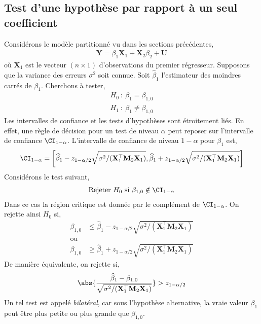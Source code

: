 \subsection{Test d'une hypothèse par rapport à un seul coefficient}
Considérons le modèle partitionné vu dans les sections précédentes,
\begin{align*}
\mathbf{Y} = \beta_1\mathbf{X}_1 + \mathbf{X}_2\beta_2 + \mathbf{U}
\end{align*}
où $\mathbf{X}_1$ est le vecteur $(n\times 1)$ d'observations du premier régresseur. Supposons que la variance des erreurs $\sigma^2$ soit connue. Soit $\widehat{\beta}_1$ l'estimateur des moindres carrés de $\beta_1$.  Cherchons à tester,
\begin{align}
H_0 \ : \  \beta_1 = \beta_{1, 0}\nonumber\\
H_1 \ : \  \beta_1 \neq \beta_{1, 0}
\label{eq34}
\end{align}
Les intervalles de confiance et les tests d'hypothèses sont étroitement liés. En effet, une règle de décision pour un test de niveau $\alpha$ peut reposer  sur l'intervalle de confiance $\CI_{1-\alpha}$. L'intervalle de confiance de niveau $1-\alpha$ pour $\beta_1$ est,
\begin{align*}
\CI_{1-\alpha} = \left[ \widehat{\beta}_1 - z_{1 - \alpha/2}\sqrt{\sigma^2/(\mathbf{X}_1^\top\mathbf{M}_2\mathbf{X}_1)},  \widehat{\beta}_1 + z_{1 - \alpha/2}\sqrt{\sigma^2/(\mathbf{X}_1^\top\mathbf{M}_2\mathbf{X}_1)}\right]
\end{align*}
Considérons le test suivant,
\begin{align*}
\textrm{Rejeter} \ H_0 \  \textrm{si} \ \beta_{1,0} \notin \CI_{1-\alpha}
\end{align*}
Dans ce cas la région critique est donnée par le complément de $ \CI_{1-\alpha}$. On rejette ainsi $H_0$ si,
\begin{align*}
\beta_{1,0}&\leq  \widehat{\beta}_1 - z_{1 - \alpha/2}\sqrt{\sigma^2/(\mathbf{X}_1^\top\mathbf{M}_2\mathbf{X}_1)}\\
\textrm{ou}&\\
\beta_{1,0}&\geq  \widehat{\beta}_1 + z_{1 - \alpha/2}\sqrt{\sigma^2/(\mathbf{X}_1^\top\mathbf{M}_2\mathbf{X}_1)}
\end{align*}
De manière équivalente, on rejette si,
\begin{align}
\abs{\frac{\widehat{\beta}_1 - \beta_{1,0}}{ \sqrt{\sigma^2/(\mathbf{X}_1^\top\mathbf{M}_2\mathbf{X}_1)}}} > z_{1-\alpha/2}
\label{eq35}
\end{align}
Un tel test est appelé \emph{bilatéral}, car sous l'hypothèse alternative, la vraie valeur $\beta_1$ peut être plus petite ou plus grande que $\beta_{1,0}$.\\
